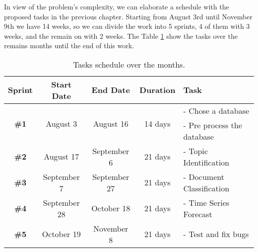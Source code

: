 In view of the problem's complexity, we can elaborate a schedule with the proposed tasks in the previous chapter. Starting from August 3rd until November 9th we have 14 weeks, so we can divide the work into 5 sprints, 4 of them with 3 weeks, and the remain on with 2 weeks. The Table \ref{tab:roadmap-table} show the tasks over the remains months until the end of this work.

\begin{table}[h!]
	\centering
	\caption{Tasks schedule over the months.}
	\label{tab:roadmap-table}
	\begin{tabular}{c|cccl}
		\hline
		       \textbf{Sprint}        &    \textbf{Start Date}    &     \textbf{End Date}      &    \textbf{Duration}     & \textbf{Task}              \\ \hline
		\multirow{2}{*}{\textbf{\#1}} & \multirow{2}{*}{August 3} & \multirow{2}{*}{August 16} & \multirow{2}{*}{14 days} & - Chose a database         \\
		                              &                           &                            &                          & - Pre process the database \\
		        \textbf{\#2}          &         August 17         &        September 6         &         21 days          & - Topic Identification     \\
		        \textbf{\#3}          &        September 7        &        September 27        &         21 days          & - Document Classification  \\
		        \textbf{\#4}          &       September 28        &         October 18         &         21 days          & - Time Series Forecast     \\
		        \textbf{\#5}          &        October 19         &         November 8         &         21 days          & - Test and fix bugs        \\ \hline
	\end{tabular}
\end{table}
